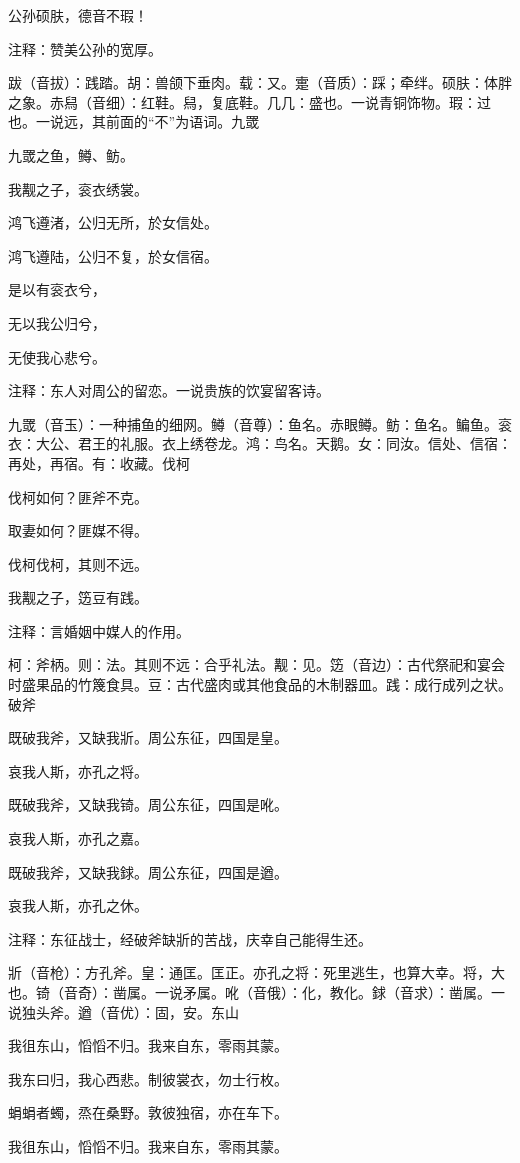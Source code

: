 \documentclass[12pt,UTF8]{ctexbook}
\begin{document}
公孙硕肤，德音不瑕！

注释：赞美公孙的宽厚。

跋（音拔）：践踏。胡：兽颌下垂肉。载：又。疐（音质）：踩；牵绊。硕肤：体胖之象。赤舄（音细）：红鞋。舄，复底鞋。几几：盛也。一说青铜饰物。瑕：过也。一说远，其前面的“不”为语词。九罭

九罭之鱼，鳟、鲂。

我觏之子，衮衣绣裳。

鸿飞遵渚，公归无所，於女信处。

鸿飞遵陆，公归不复，於女信宿。

是以有衮衣兮，

无以我公归兮，

无使我心悲兮。

注释：东人对周公的留恋。一说贵族的饮宴留客诗。

九罭（音玉）：一种捕鱼的细网。鳟（音尊）：鱼名。赤眼鳟。鲂：鱼名。鳊鱼。衮衣：大公、君王的礼服。衣上绣卷龙。鸿：鸟名。天鹅。女：同汝。信处、信宿：再处，再宿。有：收藏。伐柯

伐柯如何？匪斧不克。

取妻如何？匪媒不得。

伐柯伐柯，其则不远。

我觏之子，笾豆有践。

注释：言婚姻中媒人的作用。

柯：斧柄。则：法。其则不远：合乎礼法。觏：见。笾（音边）：古代祭祀和宴会时盛果品的竹篾食具。豆：古代盛肉或其他食品的木制器皿。践：成行成列之状。破斧

既破我斧，又缺我斨。周公东征，四国是皇。

哀我人斯，亦孔之将。

既破我斧，又缺我锜。周公东征，四国是吪。

哀我人斯，亦孔之嘉。

既破我斧，又缺我銶。周公东征，四国是遒。

哀我人斯，亦孔之休。

注释：东征战士，经破斧缺斨的苦战，庆幸自己能得生还。

斨（音枪）：方孔斧。皇：通匡。匡正。亦孔之将：死里逃生，也算大幸。将，大也。锜（音奇）：凿属。一说矛属。吪（音俄）：化，教化。銶（音求）：凿属。一说独头斧。遒（音优）：固，安。东山

我徂东山，慆慆不归。我来自东，零雨其蒙。

我东曰归，我心西悲。制彼裳衣，勿士行枚。

蜎蜎者蠋，烝在桑野。敦彼独宿，亦在车下。

我徂东山，慆慆不归。我来自东，零雨其蒙。
\end{document}

